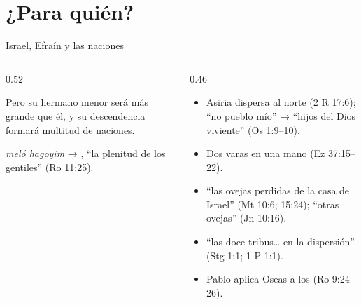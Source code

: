 \section{¿Para quién?}

\begin{frame}{Israel, Efraín y las naciones}
\begin{columns}[c,onlytextwidth]
\begin{column}{0.52\textwidth}
\centering\scriptsize{}
\begin{cita}Pero su hermano menor será más grande que él, y su descendencia formará multitud de naciones.\end{cita}
\scriptsize \emph{meló hagoyim} → , ``la plenitud de los gentiles'' (Ro 11:25).
\end{column}
\begin{column}{0.46\textwidth}\scriptsize
\begin{itemize}
\item Asiria dispersa al norte (2 R 17:6); ``no pueblo mío'' → ``hijos del Dios viviente'' (Os 1:9--10).
\item Dos varas en una mano (Ez 37:15--22).
\item ``las ovejas perdidas de la casa de Israel'' (Mt 10:6; 15:24); ``otras ovejas'' (Jn 10:16).
\item ``las doce tribus\ldots{} en la dispersión'' (Stg 1:1; 1 P 1:1).
\item Pablo aplica Oseas a los  (Ro 9:24--26).
\end{itemize}
\end{column}
\end{columns}
\end{frame}

